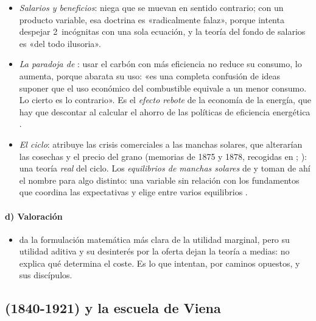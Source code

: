 \documentclass[11pt]{article}
\begin{document}
\begin{itemize}
\item \emph{Salarios y beneficios}: niega que se muevan en sentido contrario; con un producto variable, esa doctrina es «radicalmente falaz», porque intenta despejar 2~incógnitas con una sola ecuación, y la teoría del fondo de salarios es «del todo ilusoria»\nocite{Jevons1871Theory}.
\item \emph{La paradoja de }: usar el carbón con más eficiencia no reduce su consumo, lo aumenta, porque abarata su uso: «es una completa confusión de ideas suponer que el uso económico del combustible equivale a un menor consumo. Lo cierto es lo contrario»\nocite{Jevons1865Coal}. Es el \emph{efecto rebote} de la economía de la energía, que hay que descontar al calcular el ahorro de las políticas de eficiencia energética .
\item \emph{El ciclo}: atribuye las crisis comerciales a las manchas solares, que alterarían las cosechas y el precio del grano (memorias de 1875 y 1878, recogidas en \textcite{Jevons1884Investigations}; \cite{HET2026Jevons}): una teoría \emph{real} del ciclo. Los \emph{equilibrios de manchas solares} de \textcite{Azariadis1981Self} y \textcite{CassShell1983Sunspots} toman de ahí el nombre para algo distinto: una variable sin relación con los fundamentos que coordina las expectativas y elige entre varios equilibrios .
\end{itemize}

\paragraph{d) Valoración}

\begin{itemize}
\item {} da la formulación matemática más clara de la utilidad marginal, pero su utilidad aditiva y su desinterés por la oferta dejan la teoría a medias: no explica qué determina el coste. Es lo que intentan, por caminos opuestos,  y sus discípulos.
\end{itemize}

\subsection{ (1840-1921) y la escuela de Viena}\label{sec:menger}
\end{document}
